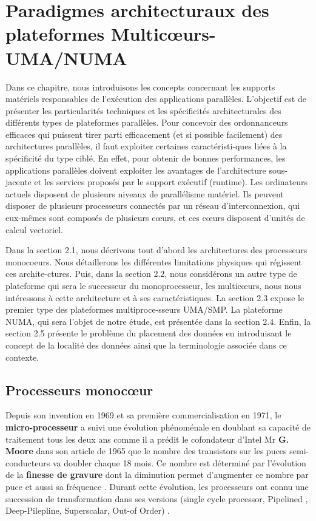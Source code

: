 ﻿\chapter{Paradigmes architecturaux des plateformes Multicœurs-UMA/NUMA}
%
Dans ce chapitre, 
nous introduisons les concepts concernant les supports matériels responsables de l'exécution des applications parallèles. 
L'objectif est de présenter les particularités techniques et les spécificités architecturales des différents types de plateformes parallèles.
Pour concevoir des ordonnanceurs efficaces qui puissent tirer parti efficacement (et si possible facilement) des architectures parallèles, 
il faut exploiter certaines caractéristi-ques liées à la spécificité du type ciblé. 
En effet, pour obtenir de bonnes performances, les applications parallèles doivent exploiter les avantages de l’architecture sous-jacente et les services proposés par le support exécutif (runtime). 
Les ordinateurs actuels disposent de plusieurs niveaux de parallélisme matériel. 
Ils peuvent disposer de plusieurs processeurs connectés par un réseau d'interconnexion, qui eux-mêmes sont composés de plusieurs cœurs, et ces cœurs disposent d’unités de calcul vectoriel. 

Dans la section 2.1, 
nous décrivons tout d’abord les architectures des processeurs monocoeurs. 
Nous détaillerons les différentes limitations physiques qui régissent ces archite-ctures. 
Puis, dans la section 2.2, 
nous considérons un autre type de plateforme qui sera le successeur du monoprocesseur, les multicœurs, nous nous intéressons à cette architecture et à ses caractéristiques.
La section 2.3 expose le premier type des plateformes multiproce-sseurs UMA/SMP.
La plateforme NUMA, qui sera l'objet de notre étude, est présentée dans la section 2.4.
Enfin, la section 2.5 présente le problème du placement des données en introduisant le concept de la localité des données ainsi que la terminologie associée dans ce contexte.
\section{Processeurs monocœur}
%
Depuis son invention en 1969 et sa première commercialisation en 1971, le \textbf{micro-processeur} a suivi une évolution phénoménale en doublant sa capacité de traitement tous les deux ans comme il a prédit le cofondateur d’Intel Mr \textbf{G. Moore} dans son article de 1965 que le nombre des transistors sur les puces semi-conducteurs va doubler chaque 18 mois. Ce nombre est déterminé par l’évolution de la \textbf{finesse de gravure} dont la diminution permet d'augmenter ce nombre par puce et aussi sa fréquence \cite{moor65}. Durant cette évolution, les processeurs ont connu une succession de transformation dans ses versions (single cycle processor, Pipelined , Deep-Pilepline, Superscalar, Out-of Order) \cite{qaca17}.

